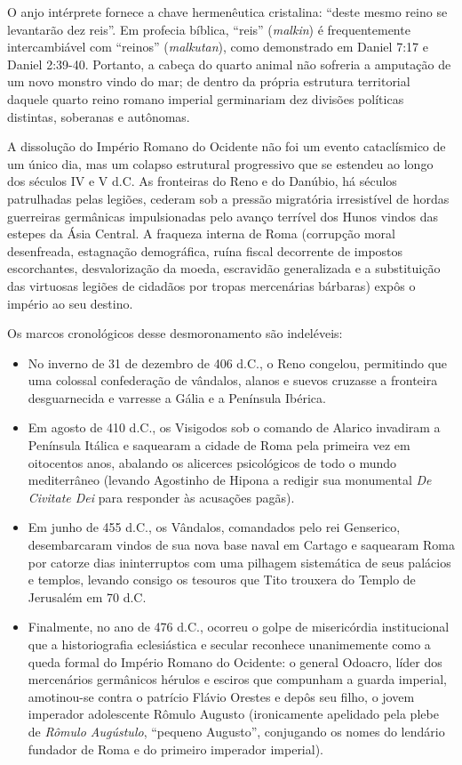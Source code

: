 \documentclass[11pt,a4paper,openany]{book}
\begin{document}
O anjo intérprete fornece a chave hermenêutica cristalina: ``deste mesmo reino se levantarão dez reis''. Em profecia bíblica, ``reis'' (\textit{malkin}) é frequentemente intercambiável com ``reinos'' (\textit{malkutan}), como demonstrado em Daniel 7:17 e Daniel 2:39-40.
Portanto, a cabeça do quarto animal não sofreria a amputação de um novo monstro vindo do mar; de dentro da própria estrutura territorial daquele quarto reino romano imperial germinariam dez divisões políticas distintas, soberanas e autônomas.

A dissolução do Império Romano do Ocidente não foi um evento cataclísmico de um único dia, mas um colapso estrutural progressivo que se estendeu ao longo dos séculos IV e V d.C. As fronteiras do Reno e do Danúbio, há séculos patrulhadas pelas legiões, cederam sob a pressão migratória irresistível de hordas guerreiras germânicas impulsionadas pelo avanço terrível dos Hunos vindos das estepes da Ásia Central.
A fraqueza interna de Roma (corrupção moral desenfreada, estagnação demográfica, ruína fiscal decorrente de impostos escorchantes, desvalorização da moeda, escravidão generalizada e a substituição das virtuosas legiões de cidadãos por tropas mercenárias bárbaras) expôs o império ao seu destino.

Os marcos cronológicos desse desmoronamento são indeléveis:
\begin{itemize}
  \item No inverno de 31 de dezembro de 406 d.C., o Reno congelou, permitindo que uma colossal confederação de vândalos, alanos e suevos cruzasse a fronteira desguarnecida e varresse a Gália e a Península Ibérica.
  \item Em agosto de 410 d.C., os Visigodos sob o comando de Alarico invadiram a Península Itálica e saquearam a cidade de Roma pela primeira vez em oitocentos anos, abalando os alicerces psicológicos de todo o mundo mediterrâneo (levando Agostinho de Hipona a redigir sua monumental \textit{De Civitate Dei} para responder às acusações pagãs).
  \item Em junho de 455 d.C., os Vândalos, comandados pelo rei Genserico, desembarcaram vindos de sua nova base naval em Cartago e saquearam Roma por catorze dias ininterruptos com uma pilhagem sistemática de seus palácios e templos, levando consigo os tesouros que Tito trouxera do Templo de Jerusalém em 70 d.C.
  \item Finalmente, no ano de 476 d.C., ocorreu o golpe de misericórdia institucional que a historiografia eclesiástica e secular reconhece unanimemente como a queda formal do Império Romano do Ocidente: o general Odoacro, líder dos mercenários germânicos hérulos e esciros que compunham a guarda imperial, amotinou-se contra o patrício Flávio Orestes e depôs seu filho, o jovem imperador adolescente Rômulo Augusto (ironicamente apelidado pela plebe de \textit{Rômulo Augústulo}, ``pequeno Augusto'', conjugando os nomes do lendário fundador de Roma e do primeiro imperador imperial).
\end{itemize}
\end{document}

